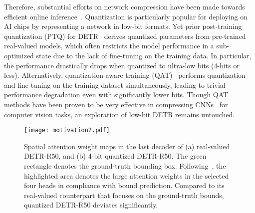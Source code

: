 \documentclass[10pt,twocolumn,letterpaper]{article}
\begin{document}
%
Therefore, substantial efforts on network compression have been made towards efficient online inference~\cite{denil2013predicting,xu2021layer,xu2022ida,romero2014fitnets}. Quantization is particularly popular for deploying on AI chips by representing a network in low-bit formats.
%
Yet prior post-training quantization (PTQ) for DETR~\cite{liu2021post} derives quantized parameters from pre-trained real-valued models, which often restricts the model performance in a sub-optimized state due to the lack of fine-tuning on the training data. In particular, the performance drastically drops when quantized to ultra-low bits (4-bits or less).
%
Alternatively, quantization-aware training (QAT)~\cite{liu2020reactnet,xu2022recurrent} performs quantization and fine-tuning on the training dataset simultaneously, leading to trivial performance degradation even with significantly lower bits. Though QAT methods have been proven to be very effective in compressing CNNs~\cite{liu2018bi,esser2019learned} for computer vision tasks, an exploration of low-bit DETR remains untouched. 




\begin{figure}
    \centering
    \texttt{[image: motivation2.pdf]} 
    \caption{Spatial attention weight maps in %
    the last decoder of (a) real-valued DETR-R50, and (b) 4-bit quantized DETR-R50.
    The green rectangle denotes the ground-truth bounding box.
    Following~\cite{meng2021conditional}, the highlighted area denotes the large attention weights in the selected four heads in compliance with bound prediction. Compared to its real-valued counterpart that focuses on the ground-truth bounds, quantized DETR-R50 deviates significantly.
    }
    \label{fig:motivation2}
\end{figure}
\end{document}
